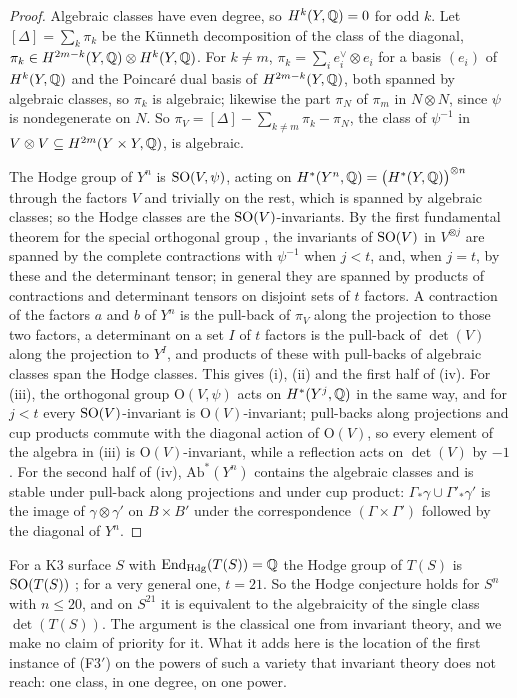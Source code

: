 \begin{proof}
Algebraic classes have even degree, so $H^{k}(Y,\mathbb{Q})=0$ for odd $k$. Let
$[\Delta]=\sum_{k}\pi_{k}$ be the K\"unneth decomposition of the class of the
diagonal, $\pi_{k}\in H^{2m-k}(Y,\mathbb{Q})\otimes H^{k}(Y,\mathbb{Q})$. For $k\ne m$,
$\pi_{k}=\sum_{i}e_{i}^{\vee}\otimes e_{i}$ for a basis $(e_{i})$ of
$H^{k}(Y,\mathbb{Q})$ and the Poincar\'e dual basis of $H^{2m-k}(Y,\mathbb{Q})$, both
spanned by algebraic classes, so $\pi_{k}$ is algebraic; likewise the part
$\pi_{N}$ of $\pi_{m}$ in $N\otimes N$, since $\psi$ is nondegenerate on $N$.
So $\pi_{V}=[\Delta]-\sum_{k\ne m}\pi_{k}-\pi_{N}$, the class of $\psi^{-1}$ in
$V\otimes V\subseteq H^{2m}(Y\times Y,\mathbb{Q})$, is algebraic.

The Hodge group of $Y^{n}$ is $\operatorname{SO}(V,\psi)$, acting on
$H^{*}(Y^{n},\mathbb{Q})=\bigl(H^{*}(Y,\mathbb{Q})\bigr)^{\otimes n}$ through the factors $V$
and trivially on the rest, which is spanned by algebraic classes; so the Hodge
classes are the $\operatorname{SO}(V)$-invariants. By the first fundamental theorem for the
special orthogonal group \cite[Chapter~5]{GW09}, the invariants of $\operatorname{SO}(V)$ in
$V^{\otimes j}$ are spanned by the complete contractions with $\psi^{-1}$ when
$j<t$, and, when $j=t$, by these and the determinant tensor; in general they
are spanned by products of contractions and determinant tensors on disjoint
sets of $t$ factors. A contraction of the factors $a$ and $b$ of $Y^{n}$ is the
pull-back of $\pi_{V}$ along the projection to those two factors, a
determinant on a set $I$ of $t$ factors is the pull-back of $\det(V)$ along
the projection to $Y^{I}$, and products of these with pull-backs of algebraic
classes span the Hodge classes. This gives (i), (ii) and the first half of
(iv). For (iii), the orthogonal group $\mathrm{O}(V,\psi)$ acts on
$H^{*}(Y^{j},\mathbb{Q})$ in the same way, and for $j<t$ every $\operatorname{SO}(V)$-invariant is
$\mathrm{O}(V)$-invariant; pull-backs along projections and cup products
commute with the diagonal action of $\mathrm{O}(V)$, so every element of the
algebra in (iii) is $\mathrm{O}(V)$-invariant, while a reflection acts on
$\det(V)$ by $-1$. For the second half of (iv), $\mathrm{Ab}^{*}(Y^{n})$
contains the algebraic classes and is stable under pull-back along projections
and under cup product: $\Gamma_{*}\gamma\cup\Gamma'_{*}\gamma'$ is the image of
$\gamma\otimes\gamma'$ on $B\times B'$ under the correspondence
$(\Gamma\times\Gamma')$ followed by the diagonal of $Y^{n}$.
\end{proof}

For a K3 surface $S$ with $\operatorname{End}_{\mathrm{Hdg}}(T(S))=\mathbb{Q}$ the Hodge group of
$T(S)$ is $\operatorname{SO}(T(S))$ \cite{Zar83}; for a very general one, $t=21$. So the
Hodge conjecture holds for $S^{n}$ with $n\le20$, and on $S^{21}$ it is
equivalent to the algebraicity of the single class $\det(T(S))$. The argument
is the classical one from invariant theory, and we make no claim of priority
for it. What it adds here is the location of the first instance of
\textup{(F3$'$)} on the powers of such a variety that invariant theory does
not reach: one class, in one degree, on one power.

